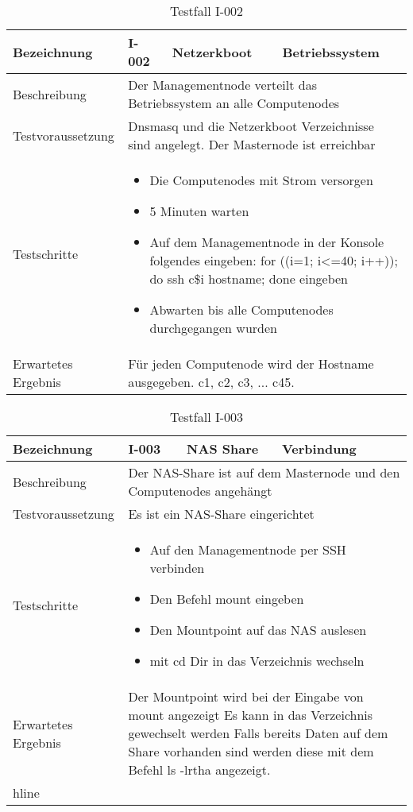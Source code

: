 \begin{table}[H]
\centering
\begin{tabular}{|p{4cm}|p{4cm}|p{4cm}|p{4cm}|}
\hline
Bezeichnung & \textbf{I-002} & Netzerkboot & Betriebssystem \\\hline
Beschreibung & \multicolumn{3}{p{12cm}|}{Der Managementnode verteilt das Betriebssystem an alle Computenodes} \\\hline
Testvoraussetzung & \multicolumn{3}{p{12cm}|}{Dnsmasq und die Netzerkboot Verzeichnisse sind angelegt. Der Masternode ist erreichbar} \\\hline
Testschritte & \multicolumn{3}{p{12cm}|}{\begin{itemize}
\item Die Computenodes mit Strom versorgen
\item 5 Minuten warten
\item Auf dem Managementnode in der Konsole folgendes eingeben: for ((i=1; i<=40; i++)); do ssh c\$i hostname; done eingeben
\item Abwarten bis alle Computenodes durchgegangen wurden
\end{itemize}} \\ \hline
Erwartetes Ergebnis & \multicolumn{3}{p{12cm}|}{Für jeden Computenode wird der Hostname ausgegeben. c1, c2, c3, ... c45.}\\\hline
\end{tabular}
\caption{Testfall I-002}
\label{Testfall I-002}
\end{table}

\begin{table}[H]
\centering
\begin{tabular}{|p{4cm}|p{4cm}|p{4cm}|p{4cm}|}
\hline
Bezeichnung & \textbf{I-003} & NAS Share & Verbindung \\\hline
Beschreibung & \multicolumn{3}{p{12cm}|}{Der NAS-Share ist auf dem Masternode und den Computenodes angehängt} \\\hline
Testvoraussetzung & \multicolumn{3}{p{12cm}|}{Es ist ein NAS-Share eingerichtet} \\\hline
Testschritte & \multicolumn{3}{p{12cm}|}{\begin{itemize}
\item Auf den Managementnode per SSH verbinden
\item Den Befehl mount eingeben
\item Den Mountpoint auf das NAS auslesen
\item mit cd Dir in das Verzeichnis wechseln
\end{itemize}} \\ \hline
Erwartetes Ergebnis & \multicolumn{3}{p{12cm}|}{Der Mountpoint wird bei der Eingabe von mount angezeigt \newline
Es kann in das Verzeichnis gewechselt werden \newline
Falls bereits Daten auf dem Share vorhanden sind werden diese mit dem Befehl ls -lrtha angezeigt.}\\hline
\end{tabular}
\caption{Testfall I-003}
\label{Testfall I-003}
\end{table}

